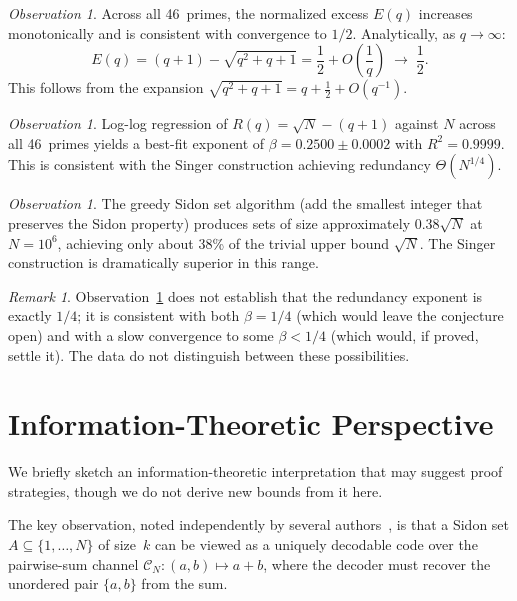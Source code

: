 \documentclass[11pt]{amsart}
\theoremstyle{plain}
\theoremstyle{definition}
\theoremstyle{remark}
\newtheorem{remark}[theorem]{Remark}
\newtheorem{observation}[theorem]{Observation}
\begin{document}
\begin{observation}\label{obs:excess}
Across all 46~primes, the normalized excess $E(q)$ increases
monotonically and is consistent with convergence to $1/2$.
Analytically, as $q \to \infty$:
\[
  E(q) = (q+1) - \sqrt{q^2+q+1}
  = \frac{1}{2} + O\!\left(\frac{1}{q}\right)
  \;\longrightarrow\; \frac{1}{2}.
\]
This follows from the expansion $\sqrt{q^2+q+1} = q + \tfrac{1}{2} + O(q^{-1})$.
\end{observation}

\begin{observation}\label{obs:redundancy}
Log-log regression of $R(q) = \sqrt{N} - (q+1)$ against $N$ across
all 46~primes yields a best-fit exponent of
$\beta = 0.2500 \pm 0.0002$ with $R^2 = 0.9999$.
This is consistent with the Singer construction achieving redundancy
$\Theta(N^{1/4})$.
\end{observation}

\begin{observation}\label{obs:greedy}
The greedy Sidon set algorithm (add the smallest integer that
preserves the Sidon property) produces sets of size approximately
$0.38\sqrt{N}$ at $N = 10^6$, achieving only about 38\% of the
trivial upper bound $\sqrt{N}$.
The Singer construction is dramatically superior in this range.
\end{observation}

\begin{remark}
Observation~\ref{obs:redundancy} does not establish that the
redundancy exponent is exactly $1/4$; it is consistent with both
$\beta = 1/4$ (which would leave the conjecture open) and with a
slow convergence to some $\beta < 1/4$ (which would, if proved,
settle it).
The data do not distinguish between these possibilities.
\end{remark}

\section{Information-Theoretic Perspective}\label{sec:info}

We briefly sketch an information-theoretic interpretation that may
suggest proof strategies, though we do not derive new bounds from it
here.

The key observation, noted independently by several
authors~\cite{sidon_coding_2024}, is
that a Sidon set $A \subseteq \{1,\dots,N\}$ of size~$k$ can be
viewed as a uniquely decodable code over the pairwise-sum channel
$\mathcal{C}_N\colon (a,b) \mapsto a + b$, where the decoder must
recover the unordered pair $\{a,b\}$ from the sum.
\end{document}
